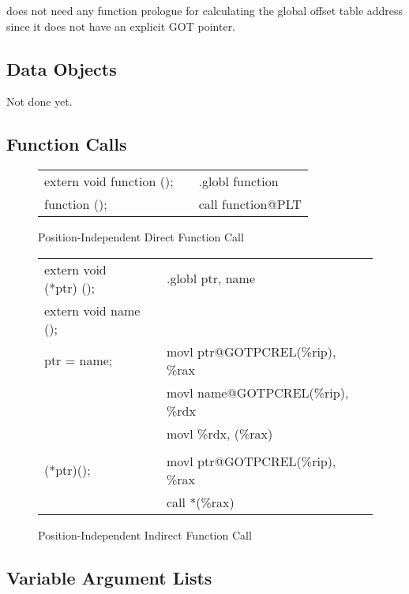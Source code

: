 \xARCH does not need any function prologue for calculating the global
offset table address since it does not have an explicit GOT pointer.

\subsection{Data Objects}

Not done yet.

\subsection{Function Calls}

\begin{figure}[H]
\Hrule
\caption{Position-Independent Direct Function Call}
\begin{center}
\begin{tabular}{|l|c|l|}
\cline{1-1}\cline{3-3}
extern void function ();  &&.globl function\\
function ();              &&call function@PLT\\
\cline{1-1}\cline{3-3}
\end{tabular}
\end{center}
\Hrule
\end{figure}

\begin{figure}[H]
\Hrule
\caption{Position-Independent Indirect Function Call}
\begin{center}
\begin{tabular}{|l|c|l|}
\cline{1-1}\cline{3-3}
extern void (*ptr) ();    &&.globl ptr, name\\
extern void name ();      && \\
ptr = name;               &&movl ptr@GOTPCREL(\%rip), \%rax  \\
                          &&movl name@GOTPCREL(\%rip), \%rdx  \\
                          &&movl \%rdx, (\%rax)  \\
                          &&  \\
(*ptr)();                 &&movl ptr@GOTPCREL(\%rip), \%rax  \\
                          &&call *(\%rax)  \\
\cline{1-1}\cline{3-3}
\end{tabular}
\end{center}
\Hrule
\end{figure}

\subsection{Variable Argument Lists}

